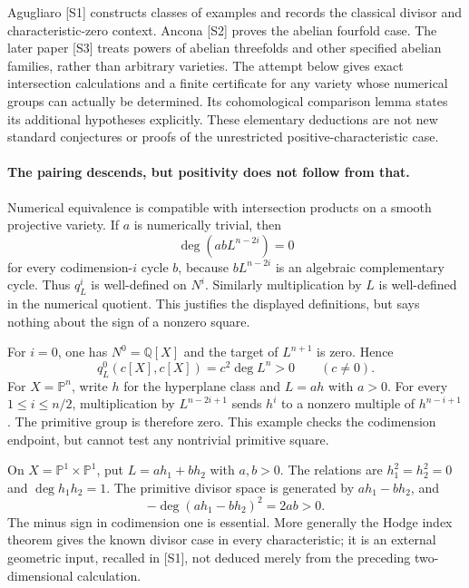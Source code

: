 \documentclass[11pt]{article}
\begin{document}
Agugliaro [S1] constructs classes of examples and records the classical
divisor and characteristic-zero context. Ancona [S2] proves the abelian
fourfold case. The later paper [S3] treats powers of abelian threefolds
and other specified abelian families, rather than arbitrary varieties.
The attempt below gives exact intersection calculations and a finite
certificate for any variety whose numerical groups can actually be
determined. Its cohomological comparison lemma states its additional
hypotheses explicitly. These elementary deductions are not new standard
conjectures or proofs of the unrestricted positive-characteristic case.

\paragraph{The pairing descends, but positivity does not follow from that.}
Numerical equivalence is compatible with intersection products on a
smooth projective variety. If $a$ is numerically trivial, then
\[
 \deg(a b L^{n-2i})=0
\]
for every codimension-$i$ cycle $b$, because $bL^{n-2i}$ is an
algebraic complementary cycle. Thus $q_L^i$ is well-defined on $N^i$.
Similarly multiplication by $L$ is well-defined in the numerical
quotient. This justifies the displayed definitions, but says nothing
about the sign of a nonzero square.

For $i=0$, one has $N^0=\mathbb Q[X]$ and the target of
$L^{n+1}$ is zero. Hence
\[
 q_L^0(c[X],c[X])=c^2\deg L^n>0\qquad(c\ne0).
\]
For $X=\mathbb P^n$, write $h$ for the hyperplane class and
$L=ah$ with $a>0$. For every $1\le i\le n/2$, multiplication by
$L^{n-2i+1}$ sends $h^i$ to a nonzero multiple of $h^{n-i+1}$.
The primitive group is therefore zero. This example checks the
codimension endpoint, but cannot test any nontrivial primitive square.

On $X=\mathbb P^1\times\mathbb P^1$, put
$L=ah_1+bh_2$ with $a,b>0$. The relations are
$h_1^2=h_2^2=0$ and $\deg h_1h_2=1$. The primitive divisor space
is generated by $ah_1-bh_2$, and
\[
 -\deg(ah_1-bh_2)^2=2ab>0.
\]
The minus sign in codimension one is essential. More generally the
Hodge index theorem gives the known divisor case in every characteristic;
it is an external geometric input, recalled in [S1], not deduced merely
from the preceding two-dimensional calculation.
\end{document}
